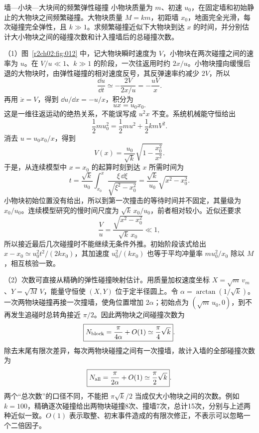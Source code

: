 \begin{practicebox}{墙—小块—大块间的频繁弹性碰撞}
小物块质量为 $m$、初速 $u_0$，在固定墙和初始静止的大物块之间频繁碰撞。大物块质量 $M=km$，初距墙 $x_0$，地面完全光滑，每次碰撞完全弹性，且 $k\gg1$。求频繁碰撞近似下大物块到达 $x$ 的时间，并分别估计大小物块之间的碰撞次数和计入撞墙后的总碰撞次数。
\label{r2ch02:pr:021}
\begin{solution}
（1）图~\ref{r2ch02:fig:012} 中，记大物块瞬时速度为 $V$，小物块在两次碰撞之间的速率为 $u$。在 $V/u\ll1$、$k\gg1$ 的阶段，一次往返用时约 $2x/u$。小物块撞向缓慢后退的大物块时，由弹性碰撞的相对速度反号，其反弹速率约减少 $2V$，所以
\[
 \frac{\dd u}{\dd t}\simeq-\frac{2V}{2x/u}=-\frac{uV}{x}.
\]
再用 $\dot x=V$，得到 $\dd u/\dd x=-u/x$，积分为
\[
 ux=u_0x_0.
\]
这是一维往返运动的绝热关系，不能误写成 $u^2x$ 不变。系统机械能守恒给出
\[
 \frac12mu_0^2=\frac12mu^2+\frac12kmV^2.
\]
消去 $u=u_0x_0/x$，得到
\[
 V(x)=\frac{u_0}{\sqrt k}\sqrt{1-\frac{x_0^2}{x^2}}.
\]
\figFrequentCollisions
于是，从连续模型中 $x=x_0$ 的起算时刻到达 $x$ 所需时间为
\[
 t=\frac{\sqrt k}{u_0}\int_{x_0}^{x}
 \frac{\xi\,\dd\xi}{\sqrt{\xi^2-x_0^2}}
 =\boxed{\frac{\sqrt k}{u_0}\sqrt{x^2-x_0^2}}.
\]
小物块初始位置没有给出，所以到第一次撞击的等待时间并不固定，其量级为 $x_0/u_0$。连续模型研究的慢时间尺度为 $\sqrt k\,x_0/u_0$，前者相对较小。近似还要求
\[
 \frac Vu=\frac{\sqrt{x^2-x_0^2}}{\sqrt k\,x_0}\ll1,
\]
所以接近最后几次碰撞时不能继续无条件外推。初始阶段该式给出
$x-x_0\simeq u_0^2t^2/(2kx_0)$，其加速度 $u_0^2/(kx_0)$ 也等于平均冲量率 $mu_0^2/x_0$ 除以 $M$，相互核验一致。

（2）次数可直接从精确的弹性碰撞映射估计。用质量加权速度坐标
$X=\sqrt m\,v_m$、$Y=\sqrt M\,V$，能量守恒使 $(X,Y)$ 位于定半径圆上。令
$\alpha=\arctan(1/\sqrt k)$。一次两物块碰撞再接一次撞墙，使角位置增加 $2\alpha$；初始点为 $(\sqrt m\,u_0,0)$，到不再发生追碰时总转角接近 $\pi/2$。因此两物块之间碰撞次数为
\[
 \boxed{N_{\rm block}=\frac{\pi}{4\alpha}+O(1)
 \simeq\frac\pi4\sqrt k}.
\]
除去末尾有限次差异，每次两物块碰撞之间有一次撞墙，故计入墙的全部碰撞次数为
\[
 \boxed{N_{\rm all}=\frac{\pi}{2\alpha}+O(1)
 \simeq\frac\pi2\sqrt k}.
\]
两个“总次数”的口径不同，不能把 $\pi\sqrt k/2$ 当成仅大小物块之间的次数。例如 $k=100$，精确逐次碰撞给出两物块碰撞8次、撞墙7次，总计15次，分别与上述两种近似一致。$O(1)$ 表示取整、初末事件造成的有限次修正，不表示可以忽略一个二倍因子。
\end{solution}
\end{practicebox}
